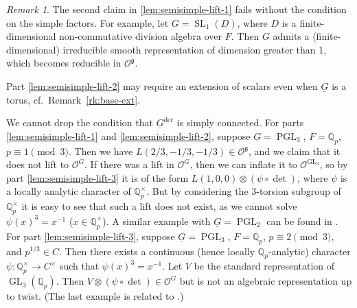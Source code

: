 \documentclass[a4paper]{amsart}
\numberwithin{equation}{section}
\theoremstyle{remark}
\newtheorem{remark}[thm]{Remark}
\theoremstyle{definition}
\newcommand{\Q}{\mathbb{Q}}
\DeclareMathOperator{\SL}{SL}
\DeclareMathOperator{\GL}{GL}
\DeclareMathOperator{\PGL}{PGL}
\newcommand{\alggrp}[1]{\underline{#1}}
\newcommand{\der}{\mathrm{der}}
\begin{document}
\begin{remark}\label{rk:need-simply-conn}
  The second claim in \ref{lem:semisimple-lift-1} fails without the condition on the simple factors. For example, let $G = \SL_1(D)$, where $D$ is a finite-dimensional non-commutative
  division algebra over $F$. Then $G$ admits a (finite-dimensional) irreducible smooth representation of dimension greater than 1, which becomes reducible in $\mathcal{O}^{\mathfrak{g}}$.

  Part \ref{lem:semisimple-lift-2} may require an extension of scalars even when $\alggrp{G}$ is a torus, cf.\ Remark~\ref{rk:base-ext}.

  We cannot drop the condition that $\alggrp{G}^{\der}$ is simply connected. 
  For parts \ref{lem:semisimple-lift-1} and \ref{lem:semisimple-lift-2}, suppose $\alggrp{G} = \PGL_3$, $F = \Q_{p}$,
  $p \equiv 1 \pmod 3$.  Then we have $L(2/3, -1/3, -1/3) \in \mathcal{O}^{\mathfrak{g}}$, and we claim that it does not lift to $\mathcal{O}^{G}$.
  If there was a lift in $\mathcal{O}^{G}$, then we can inflate it to $\mathcal{O}^{\GL_3}$, so by part \ref{lem:semisimple-lift-3} it is of the form 
  $L(1,0,0) \otimes (\psi \circ \det)$, where $\psi$ is a locally analytic character of $\Q_{p}^{\times}$. 
  But by considering the 3-torsion subgroup of $\Q_{p}^\times$ it is easy to see that such a lift does not exist,
  as we cannot solve $\psi(x)^3 = x^{-1}$ ($x \in \Q_{p}^{\times}$).
  A similar example with $\alggrp{G} = \PGL_2$ can be found in \cite[Example 2.4]{OS3}.
  For part \ref{lem:semisimple-lift-3}, suppose $\alggrp{G} = \PGL_3$, $F = \Q_{p}$, $p \equiv 2 \pmod 3$, and $p^{1/3} \in C$.
  Then there exists a continuous (hence locally $\Q_{p}$-analytic) character $\psi \colon \Q_{p}^{\times} \to C^{\times}$ such that $\psi(x)^3 = x^{-1}$. Let $V$ be the standard representation
  of $\GL_3(\Q_{p})$. Then $V \otimes (\psi\circ\det) \in \mathcal{O}^{G}$ but is not an algebraic representation up to twist.
  (The last example is related to \cite[\S3 Example]{MR1835001}.)
\end{remark}
\end{document}
